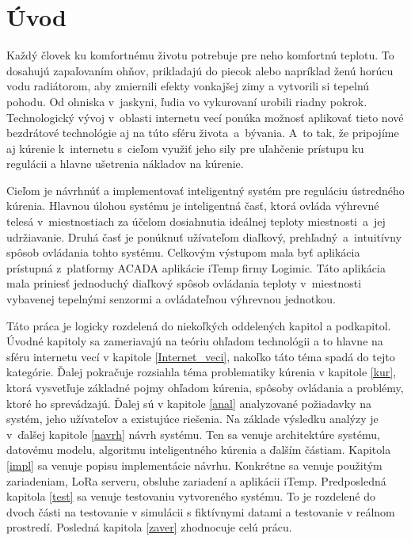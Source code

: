 \chapter{Úvod}
Každý človek ku komfortnému životu potrebuje pre neho komfortnú teplotu. 
To dosahujú zapaľovaním ohňov, prikladajú do piecok alebo napríklad ženú horúcu vodu radiátorom, aby zmiernili efekty vonkajšej zimy a vytvorili si tepelnú pohodu. 
Od ohniska v~jaskyni, ľudia vo vykurovaní urobili riadny pokrok. 
Technologický vývoj v~oblasti internetu vecí ponúka možnosť aplikovať tieto nové bezdrátové technológie aj na túto sféru života~a~bývania. 
A~to tak, že pripojíme aj kúrenie k~internetu s~cieľom využiť jeho sily pre uľahčenie prístupu ku regulácii a hlavne ušetrenia nákladov na kúrenie. 

Cieľom je návrhnúť a implementovať inteligentný systém pre reguláciu ústredného kúrenia. 
Hlavnou úlohou systému je inteligentná časť, ktorá ovláda výhrevné telesá v~miestnostiach za účelom dosiahnutia ideálnej teploty miestnosti~a~jej udržiavanie. 
Druhá časť je ponúknuť užívateľom diaľkový, prehľadný~a~intuitívny spôsob ovládania tohto systému. 
Celkovým výstupom mala byť aplikácia prístupná z~platformy ACADA aplikácie iTemp firmy Logimic. 
Táto aplikácia mala priniesť jednoduchý diaľkový spôsob ovládania teploty v~miestnosti vybavenej tepelnými senzormi a ovládateľnou výhrevnou jednotkou.

Táto práca je logicky rozdelená do niekoľkých oddelených kapitol a podkapitol. 
Úvodné kapitoly sa zameriavajú na teóriu ohľadom technológii a to hlavne na sféru internetu vecí v kapitole \ref{Internet_veci}, nakoľko táto téma spadá do tejto kategórie. 
Ďalej pokračuje rozsiahla téma problematiky kúrenia v kapitole \ref{kur}, ktorá vysvetľuje základné pojmy ohľadom kúrenia, spôsoby ovládania a problémy, ktoré ho sprevádzajú. 
Ďalej sú v kapitole \ref{anal} analyzované požiadavky na systém, jeho užívateľov a existujúce riešenia. 
Na základe výsledku analýzy je v~ďalšej kapitole \ref{navrh} návrh systému. 
Ten sa venuje architektúre systému, datovému modelu, algoritmu inteligentného kúrenia a ďalším částiam.
Kapitola \ref{impl} sa venuje popisu implementácie návrhu. 
Konkrétne sa venuje použitým zariadeniam, LoRa serveru, obsluhe zariadení a aplikácii iTemp. 
Predposledná kapitola \ref{test} sa venuje testovaniu vytvoreného systému. 
To je rozdelené do dvoch části na testovanie v simulácii s fiktívnymi datami a testovanie v reálnom prostredí.
Posledná kapitola \ref{zaver} zhodnocuje celú prácu.